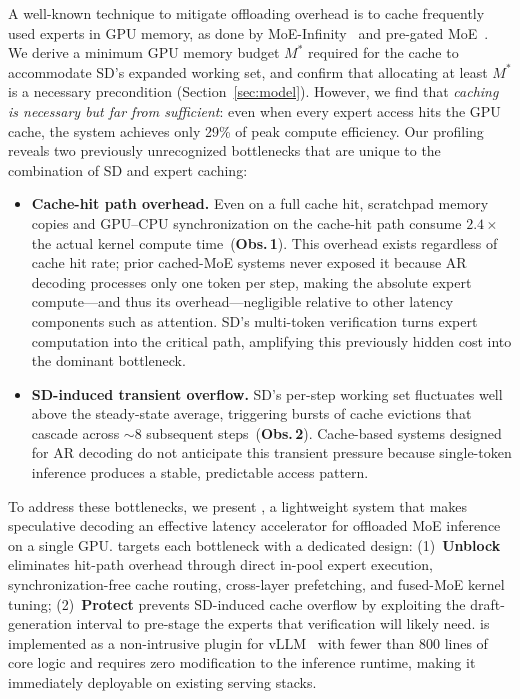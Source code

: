 A well-known technique to mitigate offloading overhead is to cache frequently used experts in GPU memory, as done by MoE-Infinity~\cite{xue2024moeinfinity} and pre-gated MoE~\cite{hwang2023pregated}.
We derive a minimum GPU memory budget $M^*$ required for the cache to accommodate SD's expanded working set, and confirm that allocating at least $M^*$ is a necessary precondition (Section~\ref{sec:model}).
However, we find that \emph{caching is necessary but far from sufficient}: even when every expert access hits the GPU cache, the system achieves only 29\% of peak compute efficiency.
Our profiling reveals two previously unrecognized bottlenecks that are unique to the combination of SD and expert caching:
%
\begin{itemize}[leftmargin=1.2em,topsep=2pt,itemsep=1pt]
\item \textbf{Cache-hit path overhead.}
Even on a full cache hit, scratchpad memory copies and GPU--CPU synchronization on the cache-hit path consume $2.4\times$ the actual kernel compute time~(\textbf{Obs.\,1}).
This overhead exists regardless of cache hit rate; prior cached-MoE systems never exposed it because AR decoding processes only one token per step, making the absolute expert compute---and thus its overhead---negligible relative to other latency components such as attention.
SD's multi-token verification turns expert computation into the critical path, amplifying this previously hidden cost into the dominant bottleneck.

\item \textbf{SD-induced transient overflow.}
SD's per-step working set fluctuates well above the steady-state average, triggering bursts of cache evictions that cascade across $\sim$8 subsequent steps~(\textbf{Obs.\,2}).
Cache-based systems designed for AR decoding do not anticipate this transient pressure because single-token inference produces a stable, predictable access pattern.
\end{itemize}

To address these bottlenecks, we present \sysname, a lightweight system that makes speculative decoding an effective latency accelerator for offloaded MoE inference on a single GPU.
\sysname targets each bottleneck with a dedicated design:
(1)~\textbf{Unblock} eliminates hit-path overhead through direct in-pool expert execution, synchronization-free cache routing, cross-layer prefetching, and fused-MoE kernel tuning;
(2)~\textbf{Protect} prevents SD-induced cache overflow by exploiting the draft-generation interval to pre-stage the experts that verification will likely need.
\sysname is implemented as a non-intrusive plugin for vLLM~\cite{kwon2023vllm} with fewer than 800 lines of core logic and requires zero modification to the inference runtime, making it immediately deployable on existing serving stacks.

